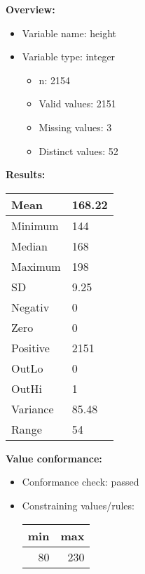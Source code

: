 \documentclass[
]{article}
\providecommand{\tightlist}{%
  \setlength{\itemsep}{0pt}\setlength{\parskip}{0pt}}
\begin{document}
\textbf{Overview:}

\begin{itemize}
\tightlist
\item
  Variable name: height
\item
  Variable type: integer

  \begin{itemize}
  \tightlist
  \item
    n: 2154
  \item
    Valid values: 2151
  \item
    Missing values: 3
  \item
    Distinct values: 52
  \end{itemize}
\end{itemize}

\textbf{Results:}\\

\begin{table}[H]
\centering
\begin{tabular}{l|l}
\hline
Mean & 168.22\\
\hline
Minimum & 144\\
\hline
Median & 168\\
\hline
Maximum & 198\\
\hline
SD & 9.25\\
\hline
Negativ & 0\\
\hline
Zero & 0\\
\hline
Positive & 2151\\
\hline
OutLo & 0\\
\hline
OutHi & 1\\
\hline
Variance & 85.48\\
\hline
Range & 54\\
\hline
\end{tabular}
\end{table}

\textbf{Value conformance:}

\begin{itemize}
\tightlist
\item
  Conformance check: passed
\item
  Constraining values/rules:

  \begin{table}[H]
  \centering
  \begin{tabular}{r|r}
  \hline
  \textbf{min} & \textbf{max}\\
  \hline
  80 & 230\\
  \hline
  \end{tabular}
  \end{table}
\end{itemize}
\end{document}
